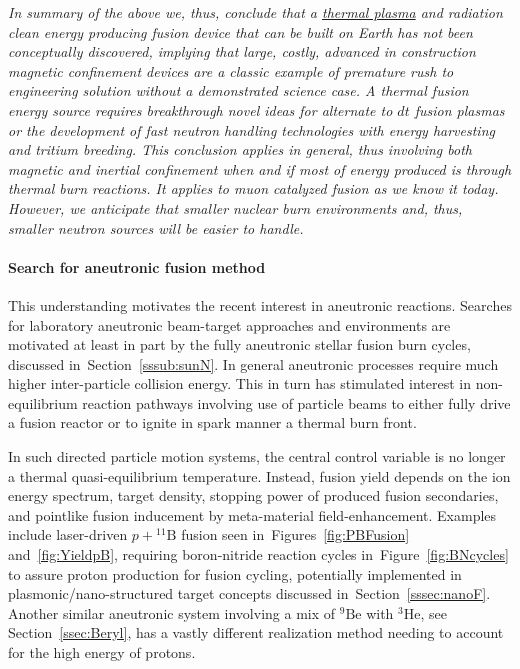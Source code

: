 \documentclass[particles,article,accept,pdftex,moreauthors]{Definitions/mdpi}
\newcommand{\rf}[1]{Figure~\ref{#1}}
\newcommand{\rsec}[1]{Section~\ref{#1}}
\begin{document}
{\it In summary of the above we, thus, conclude that a \underline{thermal plasma} and radiation clean energy producing fusion device that can be built on Earth has not been conceptually discovered, implying that large, costly, advanced in construction magnetic confinement devices are a classic example of premature rush to engineering solution without a demonstrated science case. A thermal fusion energy source requires breakthrough novel ideas for alternate to $dt$ fusion plasmas or the development of fast neutron handling technologies with energy harvesting and tritium breeding. This conclusion applies in general, thus involving both magnetic and inertial confinement when and if most of energy produced is through thermal burn reactions. It applies to muon catalyzed fusion as we know it today. However, we anticipate that smaller nuclear burn environments and, thus, smaller neutron sources will be easier to handle.}

\paragraph*{\bf Search for aneutronic fusion method}
This understanding motivates the recent interest in aneutronic reactions. Searches for laboratory aneutronic beam-target approaches and environments are motivated at least in part by the fully aneutronic stellar fusion burn cycles, discussed in~\rsec{sssub:sunN}. In general aneutronic processes require much higher inter-particle collision energy. This in turn has stimulated interest in non-equilibrium reaction pathways involving use of particle beams to either fully drive a fusion reactor or to ignite in spark manner a thermal burn front. 

In such directed particle motion systems, the central control variable is no longer a thermal quasi-equilibrium temperature. Instead, fusion yield depends on the ion energy spectrum, target density, stopping power of produced fusion secondaries, and pointlike fusion inducement by meta-material field-enhancement. Examples include laser-driven $p+{}^{11}\mathrm{B}$ fusion seen in~Figures~\ref{fig:PBFusion} and~\ref{fig:YieldpB}, requiring boron-nitride reaction cycles in~\rf{fig:BNcycles} to assure proton production for fusion cycling, potentially implemented in plasmonic/nano-structured target concepts discussed in~\rsec{sssec:nanoF}. Another similar aneutronic system involving a mix of ${}^9\mathrm{Be}$ with ${}^{3}\mathrm{He}$, see \rsec{ssec:Beryl}, has a vastly different realization method needing to account for the high energy of protons.
\end{document}
